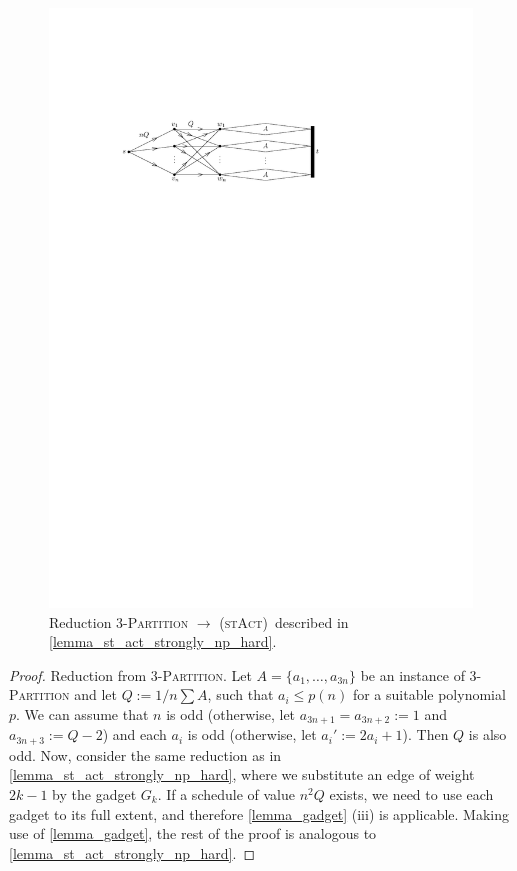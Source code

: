 \documentclass[runningheads]{llncs}
\numberwithin{equation}{section}
\newcommand{\set}[1]{\{ #1 \}}
\newcommand{\fromto}[2]{\set{#1, \ldots, #2}}
\newcommand{\stact}{\textsc{(stAct)}}
\begin{document}
\begin{figure}[htpb]
\centering
\includegraphics[scale=1]{img/st-act-strongly-np-hard}
\caption{Reduction \textsc{3-Partition} $\rightarrow$ \stact\ described in \cref{lemma_st_act_strongly_np_hard}.}
\label{fig_stact_strongly_np_hard}
\end{figure}


\stactonetwo*
\begin{proof}
Reduction from \textsc{3-Partition}. Let $A = \fromto{a_1}{a_{3n}}$ be an instance of \textsc{3-Partition} and let $Q := 1/n \sum A$, such that $a_i \leq p(n)$ for a suitable polynomial $p$. We can assume that $n$ is odd (otherwise, let $a_{3n+1} = a_{3n + 2} := 1$ and $a_{3n + 3} :=  Q - 2$) and each $a_i$ is odd (otherwise, let $a_i' := 2a_i + 1$). Then $Q$ is also odd. Now, consider the same reduction as in \cref{lemma_st_act_strongly_np_hard}, where we substitute an edge of weight $2k - 1$ by the gadget $G_k$. If a schedule of value $n^2Q$ exists, we need to use each gadget to its full extent, and therefore \cref{lemma_gadget} (iii) is applicable. Making use of \cref{lemma_gadget}, the rest of the proof is analogous to \cref{lemma_st_act_strongly_np_hard}.
\end{proof}
\end{document}
